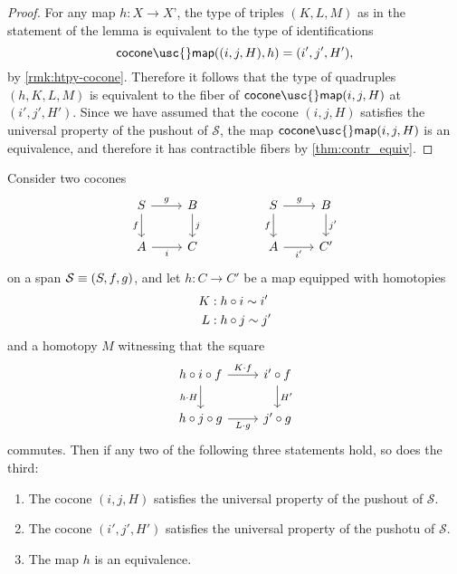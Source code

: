 \begin{proof}
  For any map $h:X\to X$', the type of triples $(K,L,M)$ as in the statement of the lemma is equivalent to the type of identifications
  \begin{equation*}
    \mathsf{cocone\usc{}map}((i,j,H),h)=(i',j',H'),
  \end{equation*}
  by \cref{rmk:htpy-cocone}. Therefore it follows that the type of quadruples $(h,K,L,M)$ is equivalent to the fiber of $\mathsf{cocone\usc{}map}(i,j,H)$ at $(i',j',H')$. Since we have assumed that the cocone $(i,j,H)$ satisfies the universal property of the pushout of $\mathcal{S}$, the map $\mathsf{cocone\usc{}map}(i,j,H)$ is an equivalence, and therefore it has contractible fibers by \cref{thm:contr_equiv}.
\end{proof}

\begin{thm}\label{thm:3-for-2-pushout}
  Consider two cocones
  \begin{equation*}
    \begin{tikzcd}
      S \arrow[r,"g"] \arrow[d,swap,"f"] & B \arrow[d,"j"]
      & & S \arrow[r,"g"] \arrow[d,swap,"f"] & B \arrow[d,"{j'}"] \\
      A \arrow[r,swap,"i"] & C
      & & A \arrow[r,swap,"{i'}"] & C'
    \end{tikzcd}
  \end{equation*}
  on a span $\mathcal{S}\equiv(S,f,g)$, and let $h:C\to C'$ be a map equipped with homotopies
  \begin{align*}
    K & : h\circ i \sim i' \\
    L & : h\circ j \sim j'
  \end{align*}
  and a homotopy $M$ witnessing that the square
  \begin{equation*}
    \begin{tikzcd}
      h\circ i\circ f \arrow[r,"K\cdot f"] \arrow[d,swap,"h\cdot H"] & i' \circ f \arrow[d,"{H'}"] \\
      h\circ j\circ g \arrow[r,swap,"L\cdot g"] & j'\circ g
    \end{tikzcd}
  \end{equation*}
  commutes. Then if any two of the following three statements hold, so does the third:
  \begin{enumerate}
  \item The cocone $(i,j,H)$ satisfies the universal property of the pushout of $\mathcal{S}$.
  \item The cocone $(i',j',H')$ satisfies the universal property of the pushotu of $\mathcal{S}$.
  \item The map $h$ is an equivalence.
  \end{enumerate}
\end{thm}

